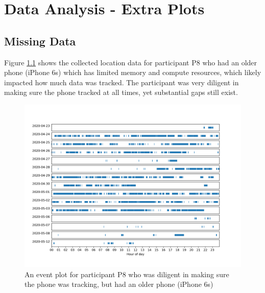\chapter{Data Analysis - Extra Plots}
\label{appendix:data-analysis}
\section{Missing Data}

Figure \ref{fig:p8-gaps} shows the collected location data for participant P8 who had an older phone (iPhone 6s) which has limited memory and compute resources, which likely impacted how much data was tracked. The participant was very diligent in making sure the phone tracked at all times, yet substantial gaps still exist.

\begin{figure}
    \centering
    \includegraphics{images/study/ec110976-0192-436d-b451-4f5dd97e71d8-gaps.png}
    \caption{An event plot for participant P8 who was diligent in making sure the phone was tracking, but had an older phone (iPhone 6s)}
    \label{fig:p8-gaps}
\end{figure}